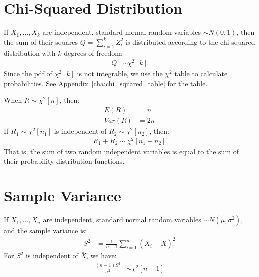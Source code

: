             \section{Chi-Squared Distribution} %
            \label{sec:chi_squared_distribution}
                If $X_1, \ldots, X_k$ are independent, standard normal random variables $\sim N(0, 1)$, then the sum of their squares $Q = \sum_{i=1}^k Z_i^2$ is distributed according to the chi-squared distribution with $k$ degrees of freedom:
                \begin{align*}
                    Q &\sim \chi^2[k]
                \end{align*}
                Since the pdf of $\chi^2[k]$ is not integrable, we use the $\chi^2$ table to calculate probabilities.
                See Appendix~\ref{cha:chi_squared_table} for the table.

                When $R \sim \chi^2[n]$, then:
                \begin{align*}
                    E(R) &= n \\
                    Var(R) &= 2n
                \end{align*}
                If $R_1 \sim \chi^2[n_1]$ is independent of $R_2 \sim \chi^2[n_2]$, then:
                \begin{align*}
                    R_1 + R_2 \sim \chi^2[n_1 + n_2]
                \end{align*}
                That is, the sum of two random independent variables is equal to the sum of their probability distribution functions.
            \section{Sample Variance} %
            \label{sec:sample_variance}
                If $X_1, \ldots, X_n$ are independent, standard normal random variables $\sim N(\mu, \sigma^2)$, and the sample variance is:
                \begin{align*}
                     S^2 &= \frac{1}{n-1} \sum_{i=1}^n (X_i - \bar{X})^2
                 \end{align*}
                 For $S^2$ is independent of $\bar{X}$, we have:
                 \begin{align*}
                     \frac{(n-1) S^2}{\sigma^2} &\sim \chi^2[n-1]
                 \end{align*}

